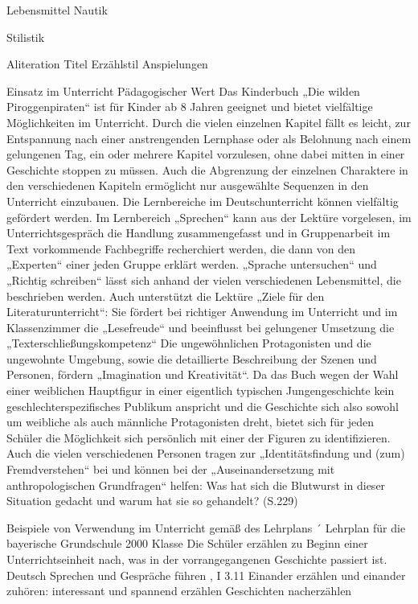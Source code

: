 Lebensmittel
Nautik

Stilistik

Aliteration Titel
Erzählstil
Anspielungen
					
					


Einsatz im Unterricht
Pädagogischer Wert
Das Kinderbuch „Die wilden Piroggenpiraten“ ist für Kinder ab 8 Jahren geeignet und bietet vielfältige Möglichkeiten im Unterricht. Durch die vielen einzelnen Kapitel fällt es leicht, zur Entspannung nach einer anstrengenden Lernphase oder als Belohnung nach einem gelungenen Tag, ein oder mehrere Kapitel vorzulesen, ohne dabei mitten in einer Geschichte stoppen zu müssen. Auch die Abgrenzung der einzelnen Charaktere in den verschiedenen Kapiteln ermöglicht nur ausgewählte Sequenzen in den Unterricht einzubauen. Die Lernbereiche im Deutschunterricht können vielfältig gefördert werden. Im Lernbereich „Sprechen“  kann aus der Lektüre vorgelesen, im Unterrichtsgespräch die Handlung zusammengefasst und in Gruppenarbeit im Text vorkommende Fachbegriffe recherchiert werden, die dann von den „Experten“ einer jeden Gruppe erklärt werden. „Sprache untersuchen“ und „Richtig schreiben“ lässt sich anhand der vielen verschiedenen Lebensmittel, die beschrieben werden. Auch unterstützt die Lektüre „Ziele für den Literaturunterricht“: Sie fördert bei richtiger Anwendung im Unterricht und im Klassenzimmer die „Lesefreude“ und beeinflusst bei gelungener Umsetzung die „Texterschließungskompetenz“ Die ungewöhnlichen Protagonisten und die ungewohnte Umgebung, sowie die detaillierte Beschreibung der Szenen und Personen, fördern „Imagination und Kreativität“. Da das Buch wegen der Wahl einer weiblichen Hauptfigur in einer eigentlich typischen Jungengeschichte kein geschlechterspezifisches Publikum anspricht und die Geschichte sich also sowohl um weibliche als auch männliche Protagonisten dreht, bietet sich für jeden Schüler die Möglichkeit sich persönlich mit einer der Figuren zu identifizieren. Auch die vielen verschiedenen Personen tragen zur „Identitätsfindung und (zum) Fremdverstehen“ bei und können bei der „Auseinandersetzung mit anthropologischen Grundfragen“ helfen: Was hat sich die Blutwurst in dieser Situation gedacht und warum hat sie so gehandelt? (S.229)



Beispiele von Verwendung im Unterricht gemäß des Lehrplans
´
Lehrplan für die bayerische Grundschule 2000
Klasse
Die Schüler erzählen zu Beginn einer Unterrichtseinheit nach, was in der vorrangegangenen Geschichte passiert ist.
Deutsch
Sprechen und Gespräche führen , I
3.11 Einander erzählen und einander zuhören: interessant und spannend erzählen Geschichten nacherzählen

